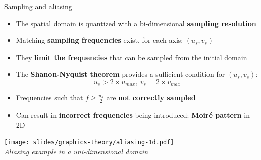 \begin{frame}{Sampling and aliasing}
  \begin{itemize}
  \item The spatial domain is quantized with a bi-dimensional \textbf{sampling resolution}
  \item Matching \textbf{sampling frequencies} exist, for each axis: \((u_s,v_s)\)
  \item They \textbf{limit the frequencies} that can be sampled from the initial domain
  \item The \textbf{Shanon-Nyquist theorem} provides a sufficient condition for \((u_s,v_s)\):
\[
u_s > 2 \times u_{max}, ~v_s = 2 \times v_{max}
\]
  \item Frequencies such that \(f \geq \frac{u_s}{2}\) are \textbf{not correctly sampled}
  \item Can result in \textbf{incorrect frequencies} being introduced: \textbf{Moiré pattern} in 2D
  \end{itemize}

  \begin{center}
  \texttt{[image: slides/graphics-theory/aliasing-1d.pdf]}\\
  \textit{\small Aliasing example in a uni-dimensional domain}
  \end{center}
\end{frame}

